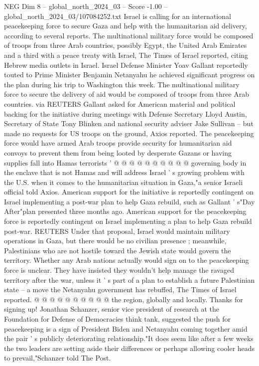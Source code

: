 \begin{textsample}{NEG Dim 8 – global\_north\_2024\_03 – Score -1.00 – global\_north\_2024\_03/107084252.txt}  \label{ex:f8_neg_227}
Israel is calling for an international peacekeeping force to secure Gaza and help with the humanitarian aid delivery, according to several reports.
The multinational military force would be composed of troops from three Arab countries, possibly Egypt, the United Arab Emirates and a third with a peace treaty with Israel, The Times of Israel reported, citing Hebrew media outlets in Israel.
Israel Defense Minister Yoav Gallant reportedly touted to Prime Minister Benjamin Netanyahu he achieved significant progress on the plan during his trip to Washington this week.
The multinational military force to secure the delivery of aid would be composed of troops from three Arab countries. via REUTERS Gallant asked for American material and political backing for the initiative during meetings with Defense Secretary Lloyd Austin, Secretary of State Tony Blinken and national security adviser Jake Sullivan -- but made no requests for US troops on the ground, Axios reported.
The peacekeeping force would have armed Arab troops provide security for humanitarian aid convoys to prevent them from being looted by desperate Gazans or having supplies fall into Hamas terrorists ' @ @ @ @ @ @ @ @ @ @ governing body in the enclave that is not Hamas and will address Israel ' s growing problem with the U.S. when it comes to the humanitarian situation in Gaza,"a senior Israeli official told Axios.
American support for the initiative is reportedly contingent on Israel implementing a post-war plan to help Gaza rebuild, such as Gallant ' s"Day After"plan presented three months ago.
American support for the peacekeeping force is reportedly contingent on Israel implementing a plan to help Gaza rebuild post-war.
REUTERS Under that proposal, Israel would maintain military operations in Gaza, but there would be no civilian presence ; meanwhile, Palestinians who are not hostile toward the Jewish state would govern the territory.
Whether any Arab nations actually would sign on to the peacekeeping force is unclear.
They have insisted they wouldn't help manage the ravaged territory after the war, unless it ' s part of a plan to establish a future Palestinian state -- a move the Netanyahu government has rebuffed, The Times of Israel reported. @ @ @ @ @ @ @ @ @ @ the region, globally and locally.
Thanks for signing up!
Jonathan Schanzer, senior vice president of research at the Foundation for Defense of Democracies think tank, suggested the push for peacekeeping is a sign of President Biden and Netanyahu coming together amid the pair ' s publicly deteriorating relationship."It does seem like after a few weeks the two leaders are setting aside their differences or perhaps allowing cooler heads to prevail,"Schanzer told The Post.

\end{textsample}
